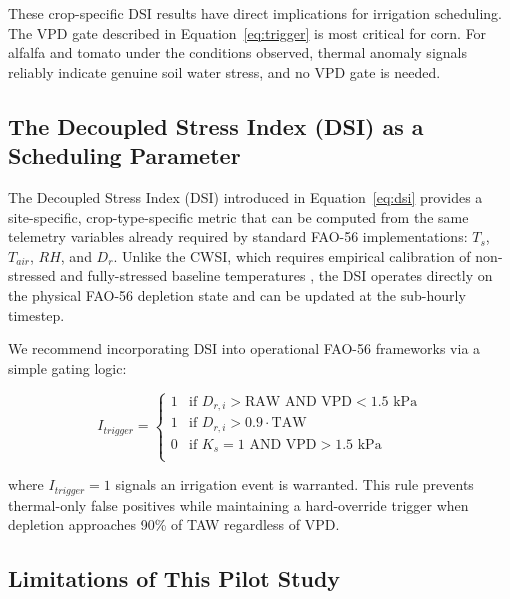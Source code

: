 \documentclass[review,12pt]{elsarticle}
\begin{document}
These crop-specific DSI results have direct implications for irrigation scheduling. The VPD gate described in Equation~\ref{eq:trigger} is most critical for corn. For alfalfa and tomato under the conditions observed, thermal anomaly signals reliably indicate genuine soil water stress, and no VPD gate is needed.

\subsection{The Decoupled Stress Index (DSI) as a Scheduling Parameter}
\label{subsec:dsi_discussion}

The Decoupled Stress Index (DSI) introduced in Equation~\ref{eq:dsi} provides a site-specific, crop-type-specific metric that can be computed from the same telemetry variables already required by standard FAO-56 implementations: $T_s$, $T_{air}$, $RH$, and $D_r$. Unlike the CWSI, which requires empirical calibration of non-stressed and fully-stressed baseline temperatures \citep{idso1981normalizing}, the DSI operates directly on the physical FAO-56 depletion state and can be updated at the sub-hourly timestep.

We recommend incorporating DSI into operational FAO-56 frameworks via a simple gating logic:

\begin{equation}
I_{trigger} = 
\begin{cases}
1 & \text{if } D_{r,i} > \text{RAW} \text{ AND VPD} < 1.5 \text{ kPa} \\
1 & \text{if } D_{r,i} > 0.9 \cdot \text{TAW} \\
0 & \text{if } K_s = 1 \text{ AND VPD} > 1.5 \text{ kPa} \\
\end{cases}
\label{eq:trigger}
\end{equation}

where $I_{trigger} = 1$ signals an irrigation event is warranted. This rule prevents thermal-only false positives while maintaining a hard-override trigger when depletion approaches 90\% of TAW regardless of VPD.

\subsection{Limitations of This Pilot Study}
\label{subsec:limitations}
\end{document}
